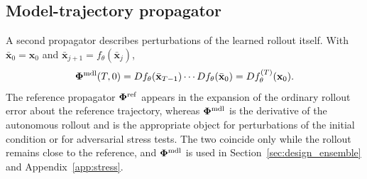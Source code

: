 \subsection{Model-trajectory propagator}

A second propagator describes perturbations of the learned rollout itself. With $\bar{\mathbf x}_0=\mathbf x_0$ and $\bar{\mathbf x}_{j+1}=f_\theta(\bar{\mathbf x}_j)$,
\begin{equation}
  \boldsymbol{\Phi}^{\rm mdl}(T,0)=Df_\theta(\bar{\mathbf x}_{T-1})\cdots Df_\theta(\bar{\mathbf x}_0)=Df_\theta^{(T)}(\mathbf x_0).
  \label{eq:model_propagator}
\end{equation}
The reference propagator $\boldsymbol{\Phi}^{\rm ref}$ appears in the expansion of the ordinary rollout error about the reference trajectory, whereas $\boldsymbol{\Phi}^{\rm mdl}$ is the derivative of the autonomous rollout and is the appropriate object for perturbations of the initial condition or for adversarial stress tests. The two coincide only while the rollout remains close to the reference, and $\boldsymbol{\Phi}^{\rm mdl}$ is used in Section~\ref{sec:design_ensemble} and Appendix~\ref{app:stress}.
